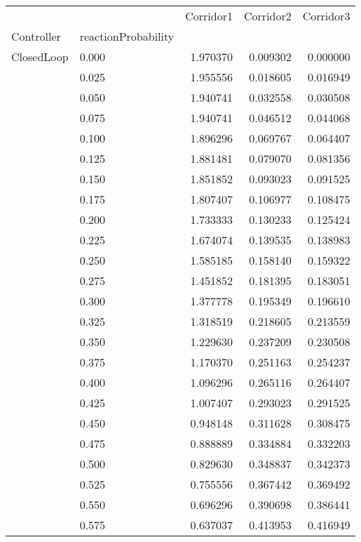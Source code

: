 \begin{tabular}{llrrr}
\toprule
         &       &  Corridor1 &  Corridor2 &  Corridor3 \\
Controller & reactionProbability &            &            &            \\
\midrule
ClosedLoop & 0.000 &   1.970370 &   0.009302 &   0.000000 \\
         & 0.025 &   1.955556 &   0.018605 &   0.016949 \\
         & 0.050 &   1.940741 &   0.032558 &   0.030508 \\
         & 0.075 &   1.940741 &   0.046512 &   0.044068 \\
         & 0.100 &   1.896296 &   0.069767 &   0.064407 \\
         & 0.125 &   1.881481 &   0.079070 &   0.081356 \\
         & 0.150 &   1.851852 &   0.093023 &   0.091525 \\
         & 0.175 &   1.807407 &   0.106977 &   0.108475 \\
         & 0.200 &   1.733333 &   0.130233 &   0.125424 \\
         & 0.225 &   1.674074 &   0.139535 &   0.138983 \\
         & 0.250 &   1.585185 &   0.158140 &   0.159322 \\
         & 0.275 &   1.451852 &   0.181395 &   0.183051 \\
         & 0.300 &   1.377778 &   0.195349 &   0.196610 \\
         & 0.325 &   1.318519 &   0.218605 &   0.213559 \\
         & 0.350 &   1.229630 &   0.237209 &   0.230508 \\
         & 0.375 &   1.170370 &   0.251163 &   0.254237 \\
         & 0.400 &   1.096296 &   0.265116 &   0.264407 \\
         & 0.425 &   1.007407 &   0.293023 &   0.291525 \\
         & 0.450 &   0.948148 &   0.311628 &   0.308475 \\
         & 0.475 &   0.888889 &   0.334884 &   0.332203 \\
         & 0.500 &   0.829630 &   0.348837 &   0.342373 \\
         & 0.525 &   0.755556 &   0.367442 &   0.369492 \\
         & 0.550 &   0.696296 &   0.390698 &   0.386441 \\
         & 0.575 &   0.637037 &   0.413953 &   0.416949 \\

\end{tabular}
